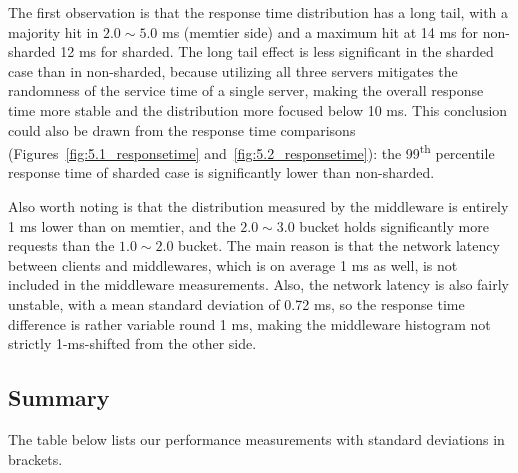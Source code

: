 The first observation is that the response time distribution has a long tail, with a majority hit in $2.0 \sim 5.0$ ms (memtier side) and a maximum hit at 14 ms for non-sharded 12 ms for sharded. The long tail effect is less significant in the sharded case than in non-sharded, because utilizing all three servers mitigates the randomness of the service time of a single server, making the overall response time more stable and the distribution more focused below 10 ms. This conclusion could also be drawn from the response time comparisons (Figures~\ref{fig:5.1_responsetime} and~\ref{fig:5.2_responsetime}): the 99\textsuperscript{th} percentile response time of sharded case is significantly lower than non-sharded.

Also worth noting is that the distribution measured by the middleware is entirely 1 ms lower than on memtier, and the $2.0 \sim 3.0$ bucket holds significantly more requests than the $1.0 \sim 2.0$ bucket. The main reason is that the network latency between clients and middlewares, which is on average 1 ms as well, is not included in the middleware measurements. Also, the network latency is also fairly unstable, with a mean standard deviation of 0.72 ms, so the response time difference is rather variable round 1 ms, making the middleware histogram not strictly 1-ms-shifted from the other side. 

\subsection{Summary}


The table below lists our performance measurements with standard deviations in brackets.

